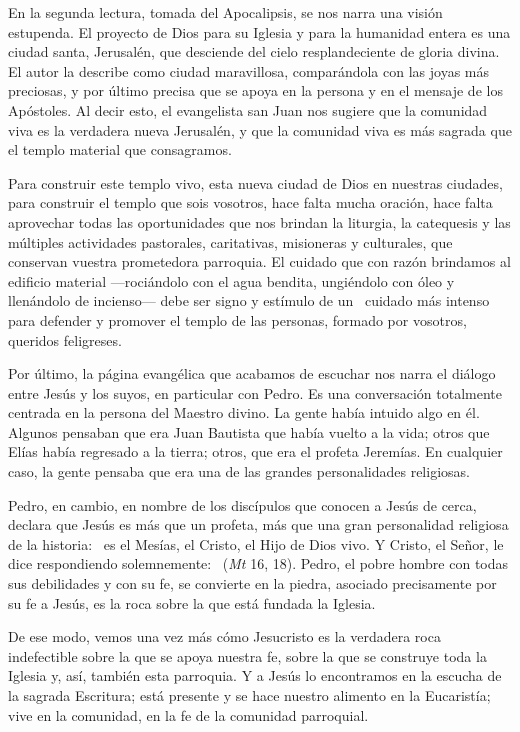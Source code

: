 En la segunda lectura, tomada del Apocalipsis, se nos narra una visión estupenda. El proyecto de Dios para su Iglesia y para la humanidad entera es una ciudad santa, Jerusalén, que desciende del cielo resplandeciente de gloria divina. El autor la describe como ciudad maravillosa, comparándola con las joyas más preciosas, y por último precisa que se apoya en la persona y en el mensaje de los Apóstoles. Al decir esto, el evangelista san Juan nos sugiere que la comunidad viva es la verdadera nueva Jerusalén, y que la comunidad viva es más sagrada que el templo material que consagramos.

Para construir este templo vivo, esta nueva ciudad de Dios en nuestras ciudades, para construir el templo que sois vosotros, hace falta mucha oración, hace falta aprovechar todas las oportunidades que nos brindan la liturgia, la catequesis y las múltiples actividades pastorales, caritativas, misioneras y culturales, que conservan  vuestra prometedora parroquia. El cuidado que con razón brindamos al edificio material ---rociándolo con el agua bendita, ungiéndolo con óleo y llenándolo de incienso--- debe ser signo y estímulo de un ~cuidado más intenso para defender y promover el templo de las personas, formado por vosotros, queridos feligreses.

Por último, la página evangélica que acabamos de escuchar nos narra el diálogo entre Jesús y los suyos, en particular con Pedro. Es una conversación totalmente centrada en la persona del Maestro divino. La gente había intuido algo en él. Algunos pensaban que era Juan Bautista que había vuelto a la vida; otros que Elías había regresado a la tierra; otros, que era el profeta Jeremías. En cualquier caso, la gente pensaba que era una de las grandes personalidades religiosas.

Pedro, en cambio, en nombre de los discípulos que conocen a Jesús de cerca, declara que Jesús es más que un profeta, más que una gran personalidad religiosa de la historia:~ es el Mesías, el Cristo, el Hijo de Dios vivo. Y Cristo, el Señor, le dice respondiendo solemnemente:~  (\emph{Mt} 16, 18). Pedro, el pobre hombre con todas sus debilidades y con su fe, se convierte en la piedra, asociado precisamente por su fe a Jesús, es la roca sobre la que está fundada la Iglesia.

De ese modo, vemos una vez más cómo Jesucristo es la verdadera roca indefectible sobre la que se apoya nuestra fe, sobre la que se construye toda la Iglesia y, así, también esta parroquia. Y a Jesús lo encontramos en la escucha de la sagrada Escritura; está presente y se hace nuestro alimento en la Eucaristía; vive en la comunidad, en la fe de la comunidad parroquial.

